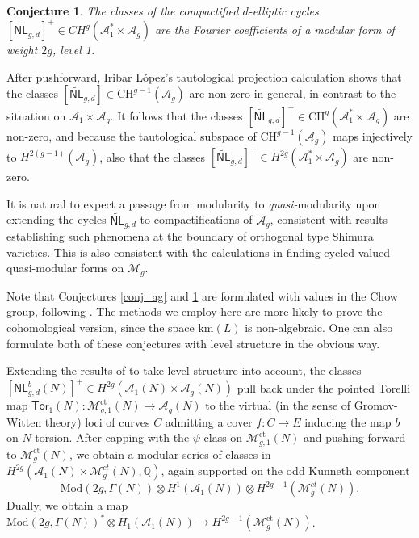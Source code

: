\documentclass[12pt]{amsart}
\def\cA{\mathcal{A}}
\def\cM{\mathcal{M}}
\def\bQ{\mathbb{Q}}
\def\barM{\overline{\cM}}
\DeclareMathOperator{\ct}{ct}
\newcommand{\A}{\mathcal A}
\newcommand{\CH}{\mathrm{CH}}
\newcommand{\Mod}{\mathrm{Mod}}
\newcommand{\NL}{{\mathsf{NL}}}
\newcommand{\wNL}{{\widetilde{\mathsf{NL}}}}
\newcommand{\Tor}{{\mathsf{Tor}}}
\newcommand{\km}{\mathrm{km}}
\newtheorem{conj}{Conjecture}
\theoremstyle{definition}
\begin{document}
\begin{conj}\label{quasimod}
    The classes of the compactified $d$-elliptic cycles $[\wNL_{g,d}]^+\in CH^{g}(\A_1^* \times \A_g)$ are the Fourier coefficients of a modular form of weight $2g$, level 1.
\end{conj}

After pushforward, Iribar L\'{o}pez's tautological projection calculation \cite{il} shows that the classes $[\wNL_{g,d}]\in\CH^{g-1}(\cA_g)$ are non-zero in general, in contrast to the situation on $\cA_1\times\cA_g$. It follows that the classes $[\wNL_{g,d}]^{+}\in \CH^{g}(\cA_1^{*}\times\cA_g)$ are non-zero, and because the tautological subspace of $\CH^{g-1}(\cA_g)$ maps injectively to $H^{2(g-1)}(\cA_g)$, also that the classes $[\wNL_{g,d}]^{+}\in H^{2g}(\cA_1^{*}\times\cA_g)$ are non-zero. 

It is natural to expect a passage from modularity to \emph{quasi-}modularity upon extending the cycles $\wNL_{g,d}$ to compactifications of $\cA_g$, consistent with results \cite{egt,gar} establishing such phenomena at the boundary of orthogonal type Shimura varieties. This is also consistent with the calculations in \cite{lian_d-ell,obpix} finding cycled-valued quasi-modular forms on $\barM_g$.

Note that Conjectures \ref{conj_ag} and \ref{quasimod} are formulated with values in the Chow group, following \cite{pand_notes_24,il}. The methods we employ here are more likely to prove the cohomological version, since the space $\km(L)$ is non-algebraic. One can also formulate both of these conjectures with level structure in the obvious way.

Extending the results of \cite{gl} to take level structure into account, the classes $[\NL^b_{g,d}(N)]^+\in H^{2g}(\cA_1(N)\times\cA_g(N))$ pull back under the pointed Torelli map $\Tor_1(N):\cM_{g,1}^{\ct}(N)\to \cA_g(N)$ to the virtual (in the sense of Gromov-Witten theory) loci of curves $C$ admitting a cover $f:C\to E$ inducing the map $b$ on $N$-torsion. After capping with the $\psi$ class on $\cM_{g,1}^{\ct}(N)$ and pushing forward to $\cM^{\ct}_g(N)$, we obtain a modular series of classes in $H^{2g}(\A_1(N)\times \cM_g^{ct}(N),\bQ)$, again supported on the odd Kunneth component
\begin{equation*}
\Mod(2g,\Gamma(N))\otimes H^1(\A_1(N))\otimes H^{2g-1}(\cM_g^{ct}(N)).
\end{equation*}
Dually, we obtain a map $\Mod(2g,\Gamma(N))^* \otimes H_1(\A_1(N)) \to H^{2g-1}(\cM^{\ct}_g(N))$. 
\end{document}
